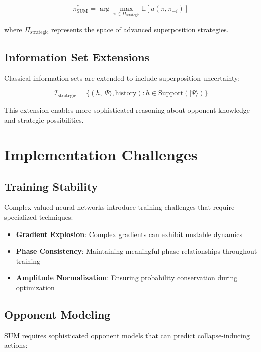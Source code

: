 \documentclass[11pt,a4paper]{article}
\begin{document}
\begin{equation}
\pi^*_{\text{SUM}} = \arg\max_{\pi \in \Pi_{\text{strategic}}} \mathbb{E}[u(\pi, \pi_{-i})]
\end{equation}

where $\Pi_{\text{strategic}}$ represents the space of advanced superposition strategies.

\subsection{Information Set Extensions}

Classical information sets are extended to include superposition uncertainty:

\begin{equation}
\mathcal{I}_{\text{strategic}} = \{(h, |\Psi\rangle, \text{history}) : h \in \text{Support}(|\Psi\rangle)\}
\end{equation}

This extension enables more sophisticated reasoning about opponent knowledge and strategic possibilities.

\section{Implementation Challenges}

\subsection{Training Stability}

Complex-valued neural networks introduce training challenges that require specialized techniques:

\begin{itemize}
\item \textbf{Gradient Explosion}: Complex gradients can exhibit unstable dynamics
\item \textbf{Phase Consistency}: Maintaining meaningful phase relationships throughout training
\item \textbf{Amplitude Normalization}: Ensuring probability conservation during optimization
\end{itemize}

\subsection{Opponent Modeling}

SUM requires sophisticated opponent models that can predict collapse-inducing actions:
\end{document}
